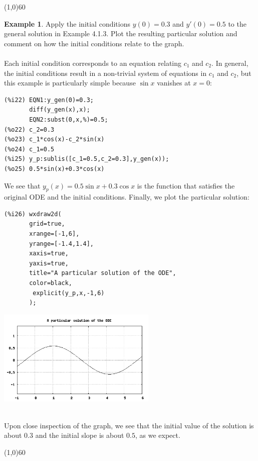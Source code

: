 \documentclass[10.5pt,twoside]{report}
\theoremstyle{definition}
\newtheorem{exmp}{Example}[section]
\begin{document}
\line(1,0){60}
\linethickness{0.5mm}


\begin{exmp} Apply the initial conditions $y(0)=0.3$ and $y'(0)=0.5$ to the general solution in Example 4.1.3.  Plot the resulting particular solution and comment on how the initial conditions relate to the graph.\\
${}$\\
Each initial condition corresponds to an equation relating $c_1$ and $c_2$.  In general, the initial conditions result in a non-trivial system of equations in $c_1$ and $c_2$, but this example is particularly simple because $\sin{x}$ vanishes at $x=0$:

\begin{verbatim}
(%i22) EQN1:y_gen(0)=0.3;
       diff(y_gen(x),x);
       EQN2:subst(0,x,%)=0.5;
(%o22) c_2=0.3
(%o23) c_1*cos(x)-c_2*sin(x)
(%o24) c_1=0.5
(%i25) y_p:sublis([c_1=0.5,c_2=0.3],y_gen(x));
(%o25) 0.5*sin(x)+0.3*cos(x)
\end{verbatim}

We see that $y_p(x)=0.5\sin{x}+0.3\cos{x}$ is the function that satisfies the original ODE and the initial conditions.  Finally, we plot the particular solution:

\begin{verbatim}
(%i26) wxdraw2d(
       grid=true,
       xrange=[-1,6],
       yrange=[-1.4,1.4],
       xaxis=true,
       yaxis=true,
       title="A particular solution of the ODE",
       color=black,
        explicit(y_p,x,-1,6)
       );
\end{verbatim}

\includegraphics[width=3in]{example_4_1_4_1}

${}$\\

Upon close inspection of the graph, we see that the initial value of the solution is about $0.3$ and the initial slope is about $0.5$, as we expect.


\end{exmp}

\line(1,0){60}
\linethickness{0.5mm}
\end{document}
